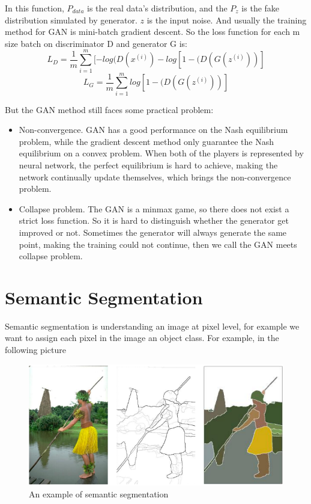 \documentclass{kththesis}
\begin{document}
\noindent In this function, $P_{data}$ is the real data's distribution, and the $P_{z}$ is the fake distribution simulated by generator. $z$ is the input noise. And usually the training method for GAN is mini-batch gradient descent. So the loss function for each m size batch on discriminator D and generator G is:
\begin{equation}
    L_D = \frac{1}{m}\sum_{i=1}^m[-log(D(x^{(i)}) -  log[1-(D(G(z^{(i)}))] 
\end{equation}
\begin{equation}
     L_G = \frac{1}{m}\sum_{i=1}^m log[1-(D(G(z^{(i)}))]
\end{equation}

But the GAN method still faces some practical problem: 
\begin{itemize}
    \item Non-convergence. GAN has a good performance on the Nash equilibrium problem, while the gradient descent method only guarantee the Nash equilibrium on a convex problem. When both of the players is represented by neural network, the perfect equilibrium is hard to achieve, making the network continually update themselves, which brings the non-convergence problem.
    \item Collapse problem\cite{salimans2016improved}. The GAN is a minmax game, so there does not exist a strict loss function. So it is hard to distinguish whether the generator get improved or not. Sometimes the generator will always generate the same point, making the training could not continue, then we call the GAN meets collapse problem. 
    
\end{itemize}

\section{Semantic Segmentation}
Semantic segmentation is understanding an image at pixel level, for example we want to assign each pixel in the image an object class. For example, in the following picture
\begin{figure}[H]
    \centering
    \includegraphics[scale = 0.4]{sem_seg.png}
    \caption{An example of semantic segmentation}
\end{figure}
\end{document}

